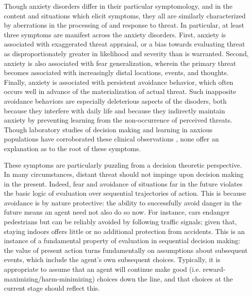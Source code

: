\documentclass[11pt]{article} %
\begin{document}
Though anxiety disorders differ in their particular symptomology, and in the content and situations which elicit symptoms, they all are similarly characterized by aberrations in the processing of and response to threat\citep{dsm5}. In particular, at least three symptoms are manifest across the anxiety disorders. First, anxiety is associated with exaggerated threat appraisal, or a bias towards evaluating threat as disproportionately greater in likelihood and severity than is warranted\citep{ClarkBeck2011}. Second, anxiety is also associated with fear generalization, wherein the primary threat becomes associated with increasingly distal locations, events, and thoughts\citep{dymond2015}. Finally, anxiety is associated with persistent avoidance behavior, which often occurs well in advance of the materialization of actual threat\citep{Arnaudova2017}. Such inapposite avoidance behaviors are especially deleterious aspects of the disoders, both because they interfere with daily life and because they indirectly maintain anxiety by preventing learning from the non-occurrence of perceived threats. Though laboratory studies of decision making and learning in anxious populations have corroborated these clinical observations \citep{Harle2017, norbury2018, Aylward2019}, none offer an explanation as to the root of these symptoms.

These symptoms are particularly puzzling from a decision theoretic perspective\citep{huys2015}. In many circumstances, distant threat should not impinge upon decision making in the present. Indeed, fear and avoidance of situations far in the future violates the basic logic of evaluation over sequential trajectories of action. This is because avoidance is by nature protective: the ability to successfully avoid danger in the future means an agent need not also do so now. For instance, cars endanger pedestrians but can be reliably avoided by following traffic signals; given that, staying indoors offers little or no additional protection from accidents. This is an instance of a fundamental property of evaluation in sequential decision making: the value of present action turns fundamentally on assumptions about subsequent events, which include the agent's own subsequent choices. Typically, it is appropriate to assume that an agent will continue make good (i.e. reward-maximizing/harm-minimizing) choices down the line, and that choices at the current stage should reflect this.
\end{document}
